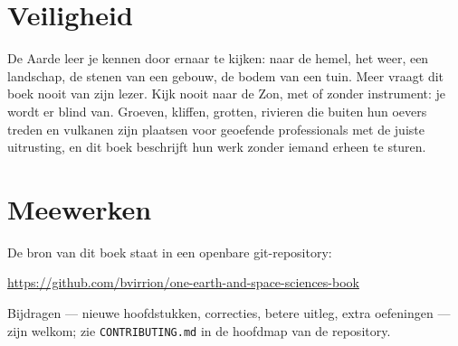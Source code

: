 \section*{Veiligheid}

De Aarde leer je kennen door ernaar te kijken: naar de hemel, het weer, een
landschap, de stenen van een gebouw, de bodem van een tuin. Meer vraagt dit
boek nooit van zijn lezer. Kijk nooit naar de Zon, met of zonder
instrument: je wordt er blind van. Groeven, kliffen, grotten, rivieren die
buiten hun oevers treden en vulkanen zijn plaatsen voor geoefende
professionals met de juiste uitrusting, en dit boek beschrijft hun werk
zonder iemand erheen te sturen.

\section*{Meewerken}

De bron van dit boek staat in een openbare git-repository:
\begin{center}
\url{https://github.com/bvirrion/one-earth-and-space-sciences-book}
\end{center}
Bijdragen --- nieuwe hoofdstukken, correcties, betere uitleg, extra
oefeningen --- zijn welkom; zie \texttt{CONTRIBUTING.md} in de hoofdmap van
de repository.
